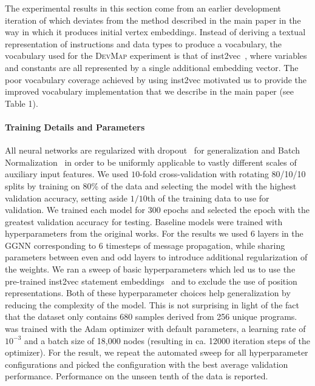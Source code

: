 The experimental results in this section come from an earlier development
iteration of \programl which deviates from the method described in the main
paper in the way in which it produces initial vertex embeddings. Instead of
deriving a textual representation of instructions and data types to produce a
vocabulary, the vocabulary used for the \textsc{DevMap} experiment is that of
inst2vec~\citep{Ben-nun2018}, where variables and constants are all represented
by a single additional embedding vector. The poor vocabulary coverage achieved
by using inst2vec motivated us to provide the improved vocabulary implementation
that we describe in the main paper (see Table 1).


\paragraph{Training Details and Parameters} All neural networks are regularized
with dropout~\citep{Hinton2012} for generalization and Batch
Normalization~\citep{Ioffe2015a} in order to be uniformly applicable to vastly
different scales of auxiliary input features. We used $10$-fold cross-validation
with rotating 80/10/10 splits by training on 80\% of the data and selecting the
model with the highest validation accuracy, setting aside $1/10$th of the
training data to use for validation. We trained each model for 300 epochs and
selected the epoch with the greatest validation accuracy for testing. Baseline
models were trained with hyperparameters from the original works. For the
\programl results we used 6 layers in the GGNN corresponding to 6 timesteps of
message propagation, while sharing parameters between even and odd layers to
introduce additional regularization of the weights. We ran a sweep of basic
hyperparameters which led us to use the pre-trained inst2vec statement
embeddings~\citep{Ben-nun2018} and to exclude the use of position
representations. Both of these hyperparameter choices help generalization by
reducing the complexity of the model. This is not surprising in light of the
fact that the dataset only contains 680 samples derived from 256 unique
programs. \programl was trained with the Adam optimizer with default parameters,
a learning rate of $10^{-3}$ and a batch size of 18,000 nodes (resulting in ca.
12000 iteration steps of the optimizer). For the \programl result, we repeat the
automated sweep for all hyperparameter configurations and picked the
configuration with the best average validation performance. Performance on the
unseen tenth of the data is reported.

